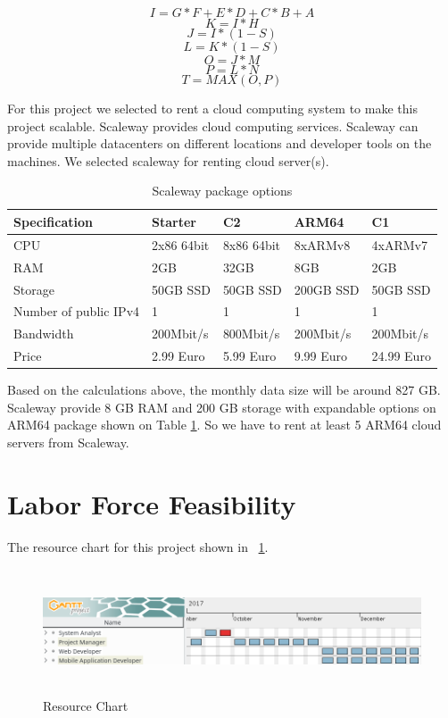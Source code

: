 \[ I = G * F + E * D + C * B + A \]
\[ K = I * H \]
\[ J = I * (1 - S) \]
\[ L = K * (1 - S) \]
\[ O = J * M \]
\[ P = L * N \]
\[ T = MAX (O, P) \]

For this project we selected to rent a cloud computing system to make this project scalable. Scaleway \cite{scaleway} provides cloud computing services. Scaleway can provide multiple datacenters on different locations and developer tools on the machines. We selected scaleway for renting cloud server(s).

\begin{table}[!ht]
\centering
\caption{Scaleway package options \cite{scaleway}}
\label{scaleway}
\begin{tabular}{|l|l|l|l|l|}
\hline
\textbf{Specification}& \textbf{Starter} & \textbf{C2}  & \textbf{ARM64} & \textbf{C1} \\ \hline
CPU                             & 2x86 64bit & 8x86 64bit  & 8xARMv8 & 4xARMv7 \\ \hline
RAM                             & 2GB & 32GB & 8GB & 2GB \\ \hline
Storage                         & 50GB SSD & 50GB SSD & 200GB SSD & 50GB SSD \\ \hline
Number of public IPv4  & 1 & 1 & 1 & 1  \\ \hline
Bandwidth                       & 200Mbit/s & 800Mbit/s & 200Mbit/s & 200Mbit/s \\ \hline
Price                       & 2.99 Euro & 5.99 Euro & 9.99 Euro & 24.99 Euro \\ \hline
\end{tabular}
\end{table}

Based on the calculations above, the monthly data size will be around 827 GB. Scaleway provide 8 GB RAM and 200 GB storage with expandable options on ARM64 package shown on Table \ref{scaleway}. So we have to rent at least 5 ARM64 cloud servers from Scaleway.

\section{Labor Force Feasibility}
The resource chart for this project shown in ~\ref{fig:resource}.

\begin{figure}[!htbp]
\centering
\includegraphics[width=\textwidth, height=10em]{projectChapters/images/resource.png}
\caption{Resource Chart}
\label{fig:resource}
\end{figure}

